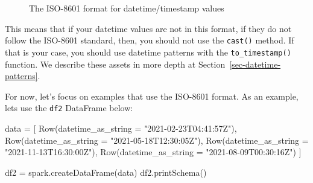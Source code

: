 \documentclass[
  11pt,
  letterpaper,
  DIV=11,
  numbers=noendperiod]{scrreprt}
\newenvironment{Shaded}{\begin{snugshade}}{\end{snugshade}}
\newcommand{\NormalTok}[1]{\textcolor[rgb]{0.00,0.23,0.31}{#1}}
\newcommand{\OperatorTok}[1]{\textcolor[rgb]{0.37,0.37,0.37}{#1}}
\newcommand{\StringTok}[1]{\textcolor[rgb]{0.13,0.47,0.30}{#1}}
\begin{document}
\begin{figure}


\caption{\label{fig-iso-8601-datetime}The ISO-8601 format for
datetime/timestamp values}

\end{figure}%

This means that if your datetime values are not in this format, if they
do not follow the ISO-8601 standard, then, you should not use the
\texttt{cast()} method. If that is your case, you should use datetime
patterns with the \texttt{to\_timestamp()} function. We describe these
assets in more depth at Section~\ref{sec-datetime-patterns}.

For now, let's focus on examples that use the ISO-8601 format. As an
example, lets use the \texttt{df2} DataFrame below:

\begin{Shaded}
\begin{Highlighting}[]
\NormalTok{data }\OperatorTok{=}\NormalTok{ [}
\NormalTok{    Row(datetime\_as\_string }\OperatorTok{=} \StringTok{"2021{-}02{-}23T04:41:57Z"}\NormalTok{),}
\NormalTok{    Row(datetime\_as\_string }\OperatorTok{=} \StringTok{"2021{-}05{-}18T12:30:05Z"}\NormalTok{),}
\NormalTok{    Row(datetime\_as\_string }\OperatorTok{=} \StringTok{"2021{-}11{-}13T16:30:00Z"}\NormalTok{),}
\NormalTok{    Row(datetime\_as\_string }\OperatorTok{=} \StringTok{"2021{-}08{-}09T00:30:16Z"}\NormalTok{)}
\NormalTok{]}

\NormalTok{df2 }\OperatorTok{=}\NormalTok{ spark.createDataFrame(data)}
\NormalTok{df2.printSchema()}
\end{Highlighting}
\end{Shaded}
\end{document}
